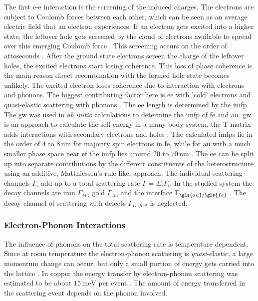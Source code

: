 \documentclass[a4paper,12pt,twoside]{article}
\begin{document}
The first e-e interaction is the screening of the induced charges. The electrons are subject to Coulomb forces between each other, which can be seen as an average electric field that an electron experiences. If an electron gets excited into a higher state, the leftover hole gets screened by the cloud of electrons available to spread over this emerging Coulomb force \cite{ziman2001electrons}.
This screening occurs on the order of attoseconds \cite{Bovensiepen2012}. After the ground state electrons screen the charge of the leftover holes, the excited electrons start losing coherence. 
This loss of phase coherence is the main reason direct recombination with the formed hole state becomes unlikely. The excited electron loses coherence due to interaction with electrons and phonons. The biggest contributing factor here is \gls{ee} with 'cold' electrons and quasi-elastic scattering with phonons \cite{decoherence}. The \gls{ee} length is determined by the \gls{imfp}. The \gls{gw} was used in \textit{ab initio} calculations to determine the \gls{imfp} of \gls{fe} and \gls{au}. \gls{gw} is an approach to calculate the self-energy in a many body system, the T-matrix adds interactions with secondary electrons and holes \cite{PhysRevB.73.125105}. The calculated \gls{imfp}s lie in the order of $4$ to $8\,\mathrm{\mbox{nm}}$ for majority spin electrons in \gls{fe}, while for \gls{au} with a much smaller phase space near \gls{ef} the \gls{imfp} lies around $20$ to $70\,\mathrm{\mbox{nm}}$ \cite{PhysRevB.73.125105,ziman2001electrons}. The \gls{ee} can be split up into separate contributions by the different constituents of the heterostructure using an additive, Matthiessen's rule like, approach. The individual scattering channels $\Gamma_{i}$ add up to a total scattering rate $\Gamma = \Sigma_i\Gamma_i$. In the studied system the decay channels are iron $\Gamma_{Fe}$, gold $\Gamma_{Au}$ and the interface $\Gamma_{\gls{au}/\gls{fe}}$ \cite{Bovensiepen2012,Knoesel1998}. The decay channel of scattering with defects $\Gamma_{Defect}$ is neglected.
	            
            \subsubsection{Electron-Phonon Interactions}
                \label{EPIchap}
The influence of phonons on the total scattering rate is temperature dependent. Since at room temperature the electron-phonon scattering is \textit{quasi}-elastic, a large momentum change can occur, but only a small portion of energy gets carried into the lattice \cite{Syed2018}. In copper the energy transfer by electron-phonon scattering was estimated to be about $15\,\mathrm{meV}$ per event \cite{Bresch1986}. The amount of energy transferred in the scattering event depends on the phonon involved.
\newpage
\end{document}
